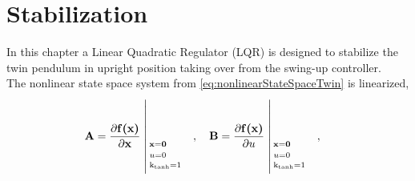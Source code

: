%
\chapter{Stabilization}
%
%
In this chapter a Linear Quadratic Regulator (LQR) is designed to stabilize the twin pendulum in upright position taking over from the swing-up controller.\\
The nonlinear state space system from \autoref{eq:nonlinearStateSpaceTwin} is linearized,
\begin{align}
  \vec{A} &= \frac{\partial \vec{f(x)}}{\partial \vec{x}} \whereThree{\vec{x}=\vec{0}\ \ \ \ }{u=0\ \ \ \ }{\text{k}_\text{tanh}=1} \ \ \ , \ \ \
  \vec{B} = \frac{\partial \vec{f(x)}}{\partial u}  \whereThree{\vec{x}=\vec{0}\ \ \ \ }{u=0\ \ \ \ }{\text{k}_\text{tanh}=1} \ \ \ ,
  \label{eq:linearTwin_AB}
\end{align}
